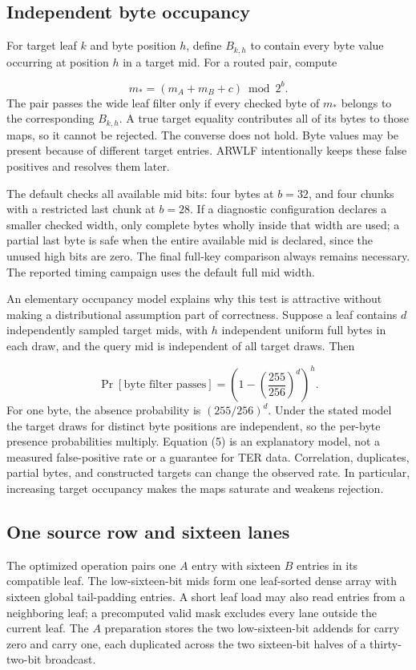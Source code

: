 \documentclass[manuscript,screen,review]{acmart}
\begin{document}
\subsection{Independent byte occupancy}
For target leaf $k$ and byte position $h$, define $B_{k,h}$ to contain every byte value occurring at position $h$ in a target mid. For a routed pair, compute

\begin{equation*}
m_*=(m_A+m_B+c)\bmod 2^b. \tag{4}
\end{equation*}
The pair passes the wide leaf filter only if every checked byte of $m_*$ belongs to the corresponding $B_{k,h}$. A true target equality contributes all of its bytes to those maps, so it cannot be rejected. The converse does not hold. Byte values may be present because of different target entries. ARWLF intentionally keeps these false positives and resolves them later.

The default checks all available mid bits: four bytes at $b=32$, and four chunks with a restricted last chunk at $b=28$. If a diagnostic configuration declares a smaller checked width, only complete bytes wholly inside that width are used; a partial last byte is safe when the entire available mid is declared, since the unused high bits are zero. The final full-key comparison always remains necessary. The reported timing campaign uses the default full mid width.

An elementary occupancy model explains why this test is attractive without making a distributional assumption part of correctness. Suppose a leaf contains $d$ independently sampled target mids, with $h$ independent uniform full bytes in each draw, and the query mid is independent of all target draws. Then

\begin{equation*}
\Pr[\text{byte filter passes}]=\left(1-\left(\frac{255}{256}\right)^d\right)^h. \tag{5}
\end{equation*}
For one byte, the absence probability is $(255/256)^d$. Under the stated model the target draws for distinct byte positions are independent, so the per-byte presence probabilities multiply. Equation (5) is an explanatory model, not a measured false-positive rate or a guarantee for TER data. Correlation, duplicates, partial bytes, and constructed targets can change the observed rate. In particular, increasing target occupancy makes the maps saturate and weakens rejection.

\subsection{One source row and sixteen lanes}
The optimized operation pairs one $A$ entry with sixteen $B$ entries in its compatible leaf. The low-sixteen-bit mids form one leaf-sorted dense array with sixteen global tail-padding entries. A short leaf load may also read entries from a neighboring leaf; a precomputed valid mask excludes every lane outside the current leaf. The $A$ preparation stores the two low-sixteen-bit addends for carry zero and carry one, each duplicated across the two sixteen-bit halves of a thirty-two-bit broadcast.
\end{document}
